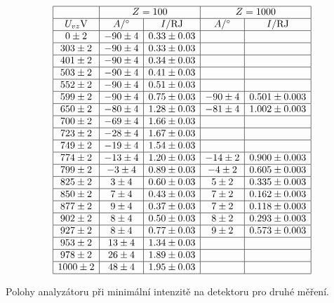 \documentclass[a4paper,12pt]{article}
\begin{document}
\begin{table}
$$
\begin{array}{|c|c|c|c|c|}
\hline
&   \multicolumn{2}{c|}{Z=100}& \multicolumn{2}{c|}{Z=1000} \\ \hline
U_{vz}\mbox{V}& A/\st&  I/\RJ&  A/\st&  I/\RJ   \\ \hline
0 \pm 2 &   -90 \pm 4&  0.33\pm 0.03& &  \\ \hline
303 \pm 2 &   -90 \pm 4& 0.33 \pm 0.03& & \\ \hline
401 \pm 2 &   -90 \pm 4& 0.34 \pm 0.03& & \\ \hline
503 \pm 2 &   -90 \pm 4& 0.41 \pm 0.03& & \\ \hline
552 \pm 2 &   -90 \pm 4& 0.51 \pm 0.03& &  \\ \hline
599 \pm 2 &   -90 \pm 4& 0.75 \pm 0.03& -90 \pm 4 & 0.501 \pm 0.003 \\ \hline
650 \pm 2 &   -80 \pm 4& 1.28 \pm 0.03& -81 \pm 4& 1.002 \pm 0.003 \\ \hline
700 \pm 2 &   -69 \pm 4& 1.66 \pm 0.03& & \\ \hline
723 \pm 2 &   -28 \pm 4& 1.67\pm 0.03& &  \\ \hline
749 \pm 2 &   -19 \pm 4& 1.54\pm 0.03& &  \\ \hline
774 \pm 2 &   -13 \pm 4& 1.20\pm 0.03& -14\pm 2 & 0.900 \pm 0.003  \\ \hline
799 \pm 2 &   -3 \pm 4& 0.89\pm 0.03& -4\pm 2 & 0.605 \pm 0.003  \\ \hline
825 \pm 2 &   3 \pm 4& 0.60\pm 0.03& 5\pm 2 & 0.335 \pm 0.003  \\ \hline
850 \pm 2 &   7 \pm 4& 0.43\pm 0.03& 7\pm 2 & 0.162 \pm 0.003  \\ \hline
877 \pm 2 &   9 \pm 4& 0.37\pm 0.03& 7\pm 2 & 0.118 \pm 0.003  \\ \hline
902 \pm 2 &   8 \pm 4& 0.50\pm 0.03& 8\pm 2 & 0.293 \pm 0.003  \\ \hline
927 \pm 2 &   8 \pm 4& 0.77\pm 0.03& 9\pm 2 & 0.573 \pm 0.003  \\ \hline
953 \pm 2 &   13 \pm 4& 1.34\pm 0.03& &  \\ \hline
978 \pm 2 &   26 \pm 4& 1.89\pm 0.03& &  \\ \hline
1000 \pm 2 &   48 \pm 4& 1.95\pm 0.03& &  \\ \hline
\end{array}
$$
\caption{Polohy analyzátoru při minimální intenzitě na detektoru pro druhé měření.}
\label{T5b}
\end{table}
\end{document}
